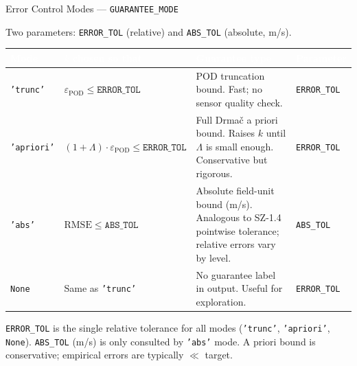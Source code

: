 \documentclass[aspectratio=169, 11pt]{beamer}
\newcommand{\epod}{\varepsilon_{\mathrm{POD}}}
\begin{document}
\begin{frame}{Error Control Modes — \texttt{GUARANTEE\_MODE}}

\vspace{0.05em}
{\small Two parameters: \texttt{ERROR\_TOL} (relative) and \texttt{ABS\_TOL} (absolute, m/s).}

\vspace{0.15em}
\scriptsize
\renewcommand{\arraystretch}{1.05}
\begin{tabular}{p{1.6cm}p{3.2cm}p{4.2cm}p{2.5cm}}
\toprule
\rowcolor{cnavy}
\textcolor{white}{\textbf{Mode}} &
\textcolor{white}{\textbf{$k$ chosen so that}} &
\textcolor{white}{\textbf{Guarantee type}} &
\textcolor{white}{\textbf{Parameter}} \\
\midrule
\texttt{'trunc'}
  & $\epod \leq \texttt{ERROR\_TOL}$
  & POD truncation bound. Fast; no sensor quality check.
  & \texttt{ERROR\_TOL} \\
\rowcolor{cice!50}
\texttt{'apriori'}
  & $(1+\Lambda)\cdot\epod \leq \texttt{ERROR\_TOL}$
  & Full Drmač a priori bound. Raises $k$ until $\Lambda$ is small enough. Conservative but rigorous.
  & \texttt{ERROR\_TOL} \\
\texttt{'abs'}
  & $\mathrm{RMSE} \leq \texttt{ABS\_TOL}$
  & Absolute field-unit bound (m/s). Analogous to SZ-1.4 pointwise tolerance; relative errors vary by level.
  & \texttt{ABS\_TOL} \\
\rowcolor{cice!50}
\texttt{None}
  & Same as \texttt{'trunc'}
  & No guarantee label in output. Useful for exploration.
  & \texttt{ERROR\_TOL} \\
\bottomrule
\end{tabular}

\vspace{0.3em}
{\scriptsize\textcolor{cmuted}{%
  \texttt{ERROR\_TOL} is the single relative tolerance for all modes (\texttt{'trunc'}, \texttt{'apriori'}, \texttt{None}).
  \texttt{ABS\_TOL} (m/s) is only consulted by \texttt{'abs'} mode.
  A priori bound is conservative; empirical errors are typically $\ll$ target.}}

\end{frame}
\end{document}
